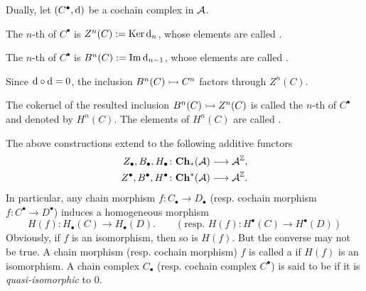 {Dually, let $(C^{\bullet},\mathrm{d})$ be a cochain complex in ${\cal A}$.
\begin{proplist}[resume]
\item 
The $n$-th  of $C^{\bullet}$ 
is $Z^n(C) := \operatorname{Ker}\mathrm{d}_n$, 
whose elements are called .
\item 
The $n$-th  of $C^{\bullet}$ 
is $B^n(C) := \operatorname{Im}\mathrm{d}_{n-1}$, 
whose elements are called .
\end{proplist}
Since $\mathrm{d}\circ\mathrm{d} = 0$, 
the inclusion $B^n(C)\rightarrowtail C^n$ factors through $Z^n(C)$. 
\begin{proplist}[resume]
\item 
The cokernel of the resulted inclusion $B^n(C)\rightarrowtail Z^n(C)$ 
is called the $n$-th  
of $C^{\bullet}$ 
and denoted by $H^n(C)$. 
The elements of $H^n(C)$ are called . 
\end{proplist} 
The above constructions extend to the following additive functors
\begin{align*}
Z_{\bullet}, B_{\bullet}, H_{\bullet}\colon&
\mathbf{Ch}_{\ast}({\cal A})\longrightarrow{\cal A}^{{\mathbb Z}}, \\
Z^{\bullet}, B^{\bullet}, H^{\bullet}\colon&
\mathbf{Ch}^{\ast}({\cal A})\longrightarrow{\cal A}^{{\mathbb Z}}.
\end{align*}
In particular, any chain morphism 
$f\colon C_{\bullet}\to D_{\bullet}$ 
(resp. cochain morphism $f\colon C^{\bullet}\to D^{\bullet}$)
induces a homogeneous morphism 
\[
H(f)\colon H_{\bullet}(C)\to H_{\bullet}(D).\qquad
(\text{resp. }H(f)\colon H^{\bullet}(C)\to H^{\bullet}(D))
\]
Obviously, if $f$ is an isomorphism, then so is $H(f)$. But the converse may not be true.
A chain morphism (resp. cochain morphism) $f$ is called a  if 
$H(f)$ is an isomorphism. 
A chain complex $C_{\bullet}$ (resp. cochain complex $C^{\bullet}$) 
is said to be  if 
it is \emph{quasi-isomorphic} to $0$.
}


